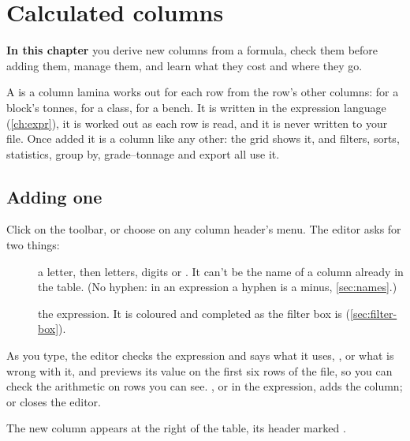 \chapter{Calculated columns}\label{ch:calc}
\begin{goals}
\textbf{In this chapter} you derive new columns from a formula, check them before adding them, manage
them, and learn what they cost and where they go.
\end{goals}

A  is a column lamina works out for each row from the row's other columns:
 for a block's tonnes,  for a class,
 for a bench. It is written in the expression language (\cref{ch:expr}), it is worked out
as each row is read, and it is never written to your file. Once added it is a column like any other:
the grid shows it, and filters, sorts, statistics, group by, grade–tonnage and export all use it.

\section{Adding one}\label{sec:add-calc}

Click  on the toolbar, or choose  on any column header's menu.
The editor asks for two things:

\begin{description}
\item[] a letter, then letters, digits or \code{\_}. It can't be the name of a column already
in the table. (No hyphen: in an expression a hyphen is a minus, \cref{sec:names}.)
\item[] the expression. It is coloured and completed as the filter box is
(\cref{sec:filter-box}).
\end{description}

As you type, the editor checks the expression and says what it uses, ,
or what is wrong with it, and previews its value on the first six rows of the file, so you can check the
arithmetic on rows you can see. , or  in the expression, adds the column;  or
 closes the editor.


The new column appears at the right of the table, its header marked .

